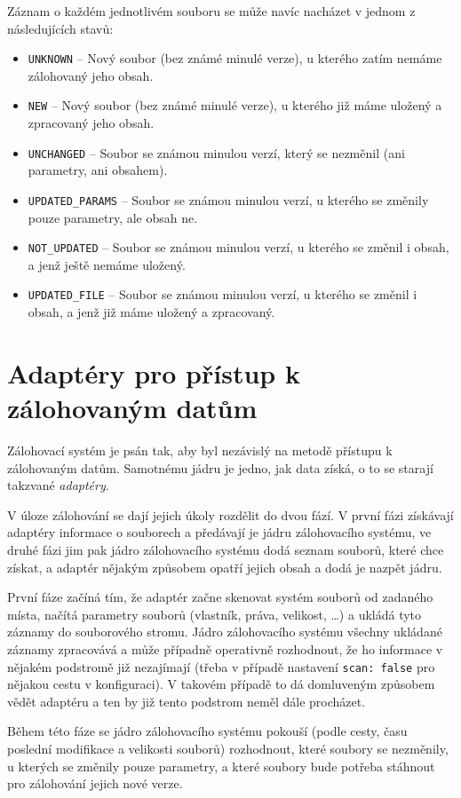Záznam o každém jednotlivém souboru se může navíc nacházet v jednom z
následujících stavů:
\begin{itemize}
	\item\texttt{UNKNOWN} -- Nový soubor (bez známé minulé verze), u kterého
	zatím nemáme zálohovaný jeho obsah.
	\item\texttt{NEW} -- Nový soubor (bez známé minulé verze), u kterého již
	máme uložený a zpracovaný jeho obsah.
	\item\texttt{UNCHANGED} -- Soubor se známou minulou verzí, který se
	nezměnil (ani parametry, ani obsahem).
	\item\texttt{UPDATED\_PARAMS} -- Soubor se známou minulou verzí, u kterého
	se změnily pouze parametry, ale obsah ne.
	\item\texttt{NOT\_UPDATED} -- Soubor se známou minulou verzí, u kterého
	se změnil i obsah, a jenž ještě nemáme uložený.
	\item\texttt{UPDATED\_FILE} -- Soubor se známou minulou verzí, u kterého
	se změnil i obsah, a jenž již máme uložený a zpracovaný.
\end{itemize}

\section{Adaptéry pro přístup k zálohovaným datům}

Zálohovací systém je psán tak, aby byl nezávislý na metodě přístupu k zálohovaným
datům. Samotnému jádru je jedno, jak data získá, o to se starají takzvané
{\it adaptéry}.

V úloze zálohování se dají jejich úkoly rozdělit do dvou fází. V první fázi
získávají adaptéry informace o souborech a předávají je jádru zálohovacího
systému, ve druhé fázi jim pak jádro zálohovacího systému dodá seznam souborů,
které chce získat, a adaptér nějakým způsobem opatří jejich obsah a dodá je
nazpět jádru.

První fáze začíná tím, že adaptér začne skenovat systém souborů od zadaného
místa, načítá parametry souborů (vlastník, práva, velikost, \dots) a ukládá tyto
záznamy do souborového stromu. Jádro zálohovacího systému všechny ukládané
záznamy zpracovává a může případně operativně rozhodnout, že ho informace v nějakém
podstromě již nezajímají (třeba v případě nastavení \texttt{scan: false} pro
nějakou cestu v konfiguraci). V takovém případě to dá domluveným způsobem vědět
adaptéru a ten by již tento podstrom neměl dále procházet.

Během této fáze se jádro zálohovacího systému pokouší (podle cesty, času poslední
modifikace a velikosti souborů) rozhodnout, které soubory se nezměnily, u kterých
se změnily pouze parametry, a které soubory bude potřeba stáhnout pro zálohování
jejich nové verze.

